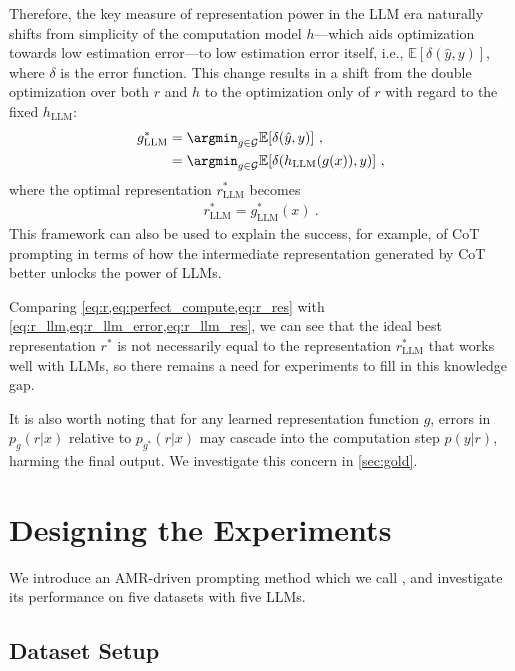Therefore, the key measure of representation power in the LLM era naturally shifts from simplicity of the computation model $h$---which aids optimization towards low estimation error---to low estimation error itself, i.e., $\mathbb{E}[\delta(\hat{y}, y)]$, where $\delta$ is the error function.
This change results in a shift from the double optimization over both $r$ and $h$ to the optimization only of $r$ with regard to the fixed $h_{\mathrm{LLM}}$:
\begin{align}
    g^*_{\mathrm{LLM}} &= \argmin_{g\in \mathcal{G}} \mathbb{E}[\delta(\hat{y} , y)]  
    ~,\label{eq:r_llm_error}
    \\
    &= \argmin_{g\in \mathcal{G}} \mathbb{E}[\delta(h_{\mathrm{LLM}}(g(x)) , y)]
    ~,\label{eq:r_llm}
\end{align}
where the optimal representation $r^*_{\mathrm{LLM}}$ becomes
\begin{align}
    r^*_{\mathrm{LLM}} = g^*_{\mathrm{LLM}}(x)
    ~.\label{eq:r_llm_res}
\end{align} 
This framework can also be used to explain the success, for example, of CoT prompting \cite{wei2022chain,nye2021show} in terms of how the intermediate representation generated by CoT better unlocks the power of LLMs.


Comparing \cref{eq:r,eq:perfect_compute,eq:r_res} with \cref{eq:r_llm,eq:r_llm_error,eq:r_llm_res}, we can see that the ideal best representation $r^*$ is not necessarily equal to the representation $r^*_{\mathrm{LLM}}$ that works well with LLMs, so there remains a need for experiments to fill in this knowledge gap.


It is also worth noting that for any learned representation function $g$, errors in $p_g(r|x)$ relative to $p_{g^*}(r|x)$ may cascade into the computation step $p(y|r)$, harming the final output. We investigate this concern in \cref{sec:gold}.







\section{Designing the \ourmodel Experiments}\label{sec:exp}

We introduce an AMR-driven prompting method which we call \ourmodel, and investigate its performance on five datasets with five LLMs.
\subsection{Dataset Setup}


